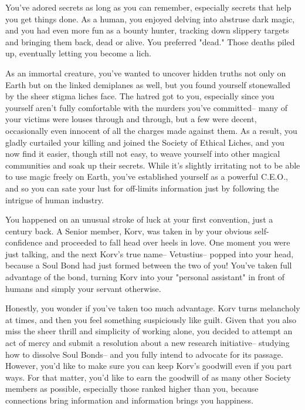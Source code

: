 \documentclass[char]{Sel}
\begin{document}
\name{\cLock{}}
You've adored secrets as long as you can remember, especially secrets that help you get things done. As a human, you enjoyed delving into abstruse dark magic, and you had even more fun as a bounty hunter, tracking down slippery targets and bringing them back, dead or alive. You preferred "dead." Those deaths piled up, eventually letting you become a lich.

As an immortal creature, you've wanted to uncover hidden truths not only on Earth but on the linked demiplanes as well, but you found yourself stonewalled by the sheer stigma liches face. The hatred got to you, especially since you yourself aren't fully comfortable with the murders you've committed-- many of your victims were louses through and through, but a few were decent, occasionally even innocent of all the charges made against them. As a result, you gladly curtailed your killing and joined the Society of Ethical Liches, and you now find it easier, though still not easy, to weave yourself into other magical communities and soak up their secrets. While it's slightly irritating not to be able to use magic freely on Earth, you've established yourself as a powerful C.E.O., and so you can sate your lust for off-limits information just by following the intrigue of human industry.

You happened on an unusual stroke of luck at your first convention, just a century back. A Senior member, Korv, was taken in by your obvious self-confidence and proceeded to fall head over heels in love. One moment you were just talking, and the next Korv’s true name-- Vetustius-- popped into your head, because a Soul Bond had just formed between the two of you! You've taken full advantage of the bond, turning Korv into your "personal assistant" in front of humans and simply your servant otherwise.

Honestly, you wonder if you've taken too much advantage. Korv turns melancholy at times, and then you feel something suspiciously like guilt. Given that you also miss the sheer thrill and simplicity of working alone, you decided to attempt an act of mercy and submit a resolution about a new research initiative-- studying how to dissolve Soul Bonds-- and you fully intend to advocate for its passage. However, you'd like to make sure you can keep Korv's goodwill even if you part ways. For that matter, you’d like to earn the goodwill of as many other Society members as possible, especially those ranked higher than you, because connections bring information and information brings you happiness.
\end{document}
